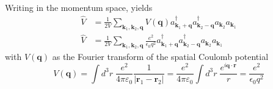 \documentclass[../../../main.tex]{subfiles}
\begin{document}
Writing in the momentum space, yields
\begin{align*}
  \hat{V }
   & = \frac{1}{2V} \sum_{\mathbf{k}_1,\mathbf{k}_2,\mathbf{q}} V(\mathbf{q}) a_{\mathbf{k}_1+\mathbf{q}}^\dagger a_{\mathbf{k}_2-\mathbf{q}}^\dagger a_{\mathbf{k}_2} a_{\mathbf{k}_1}               \\
  \hat{V }
   & = \frac{1}{2V} \sum_{\mathbf{k}_1,\mathbf{k}_2,\mathbf{q}} \frac{e^2 }{\epsilon_0 q^2} a_{\mathbf{k}_1+\mathbf{q}}^\dagger a_{\mathbf{k}_2-\mathbf{q}}^\dagger a_{\mathbf{k}_2} a_{\mathbf{k}_1}
\end{align*}
\begin{equation*}
\end{equation*}
with $V(\mathbf{q})$ as the Fourier transform of the spatial Coulomb potential
\begin{equation*}
  V(\mathbf{q })
  = \int d^3r\;    \frac{e^2}{4\pi\varepsilon_0}\frac{1}{|{\mathbf r}_1-{\mathbf r}_2|}
  =\frac{e^2}{4\pi\varepsilon_0} \int d^3r\;    \frac{e ^{i \mathbf{q }\cdot \mathbf{r}}}{r}
  = \frac{e^2 }{\epsilon_0 q^2}
\end{equation*}
\end{document}
